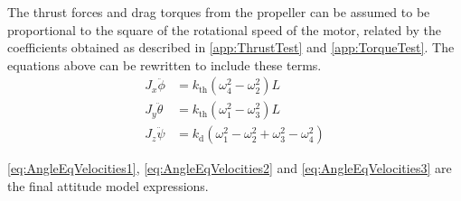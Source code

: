 The thrust forces and drag torques from the propeller can be assumed to be proportional to the square of the rotational speed of the motor, related by the coefficients obtained as described in \autoref{app:ThrustTest} and \ref{app:TorqueTest}. The equations above can be rewritten to include these terms.
\begin{align}
J_x \ddot{\phi}&=k_\mathrm{th} (\omega^2_4-\omega^2_2)  L \label{eq:AngleEqVelocities1}\\
J_y \ddot{\theta}&=k_\mathrm{th} (\omega^2_1-\omega^2_3)  L \label{eq:AngleEqVelocities2} \\
J_z \ddot{\psi}&=k_\mathrm{d} (\omega^2_1-\omega^2_2+\omega^2_3-\omega^2_4)
\label{eq:AngleEqVelocities3}
\end{align}
\vspace{-0.3 cm}
\begin{where}
\end{where}
%

\autoref{eq:AngleEqVelocities1}, \ref{eq:AngleEqVelocities2} 
and \ref{eq:AngleEqVelocities3} are the final attitude model expressions. %